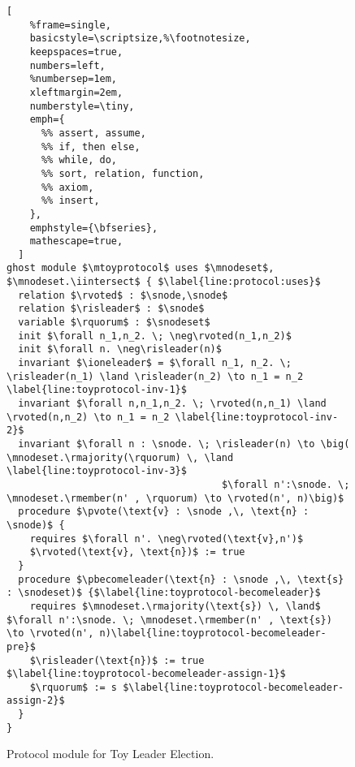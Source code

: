 \begin{figure}
\begin{lstlisting}[
    %frame=single,
    basicstyle=\scriptsize,%\footnotesize,
    keepspaces=true,
    numbers=left,
    %numbersep=1em,
    xleftmargin=2em,
    numberstyle=\tiny,
    emph={
      %% assert, assume,
      %% if, then else,
      %% while, do,
      %% sort, relation, function,
      %% axiom,
      %% insert,
    },
    emphstyle={\bfseries},
    mathescape=true,
  ]
ghost module $\mtoyprotocol$ uses $\mnodeset$, $\mnodeset.\iintersect$ { $\label{line:protocol:uses}$
  relation $\rvoted$ : $\snode,\snode$
  relation $\risleader$ : $\snode$
  variable $\rquorum$ : $\snodeset$
  init $\forall n_1,n_2. \; \neg\rvoted(n_1,n_2)$
  init $\forall n. \neg\risleader(n)$
  invariant $\ioneleader$ = $\forall n_1, n_2. \; \risleader(n_1) \land \risleader(n_2) \to n_1 = n_2 \label{line:toyprotocol-inv-1}$
  invariant $\forall n,n_1,n_2. \; \rvoted(n,n_1) \land \rvoted(n,n_2) \to n_1 = n_2 \label{line:toyprotocol-inv-2}$
  invariant $\forall n : \snode. \; \risleader(n) \to \big( \mnodeset.\rmajority(\rquorum) \, \land \label{line:toyprotocol-inv-3}$
                                     $\forall n':\snode. \; \mnodeset.\rmember(n' , \rquorum) \to \rvoted(n', n)\big)$
  procedure $\pvote(\text{v} : \snode ,\, \text{n} : \snode)$ {
    requires $\forall n'. \neg\rvoted(\text{v},n')$
    $\rvoted(\text{v}, \text{n})$ := true
  }
  procedure $\pbecomeleader(\text{n} : \snode ,\, \text{s} : \snodeset)$ {$\label{line:toyprotocol-becomeleader}$
    requires $\mnodeset.\rmajority(\text{s}) \, \land$ $\forall n':\snode. \; \mnodeset.\rmember(n' , \text{s}) \to \rvoted(n', n)\label{line:toyprotocol-becomeleader-pre}$
    $\risleader(\text{n})$ := true $\label{line:toyprotocol-becomeleader-assign-1}$
    $\rquorum$ := s $\label{line:toyprotocol-becomeleader-assign-2}$
  }
}
\end{lstlisting}
\caption{\label{fig:toyprotocol}Protocol module for Toy Leader Election.}
\end{figure}
